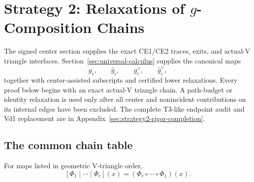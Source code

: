 \section{Strategy 2: Relaxations of \(g\)-Composition Chains}
\label{sec:strategy2-reader}

The signed center section supplies the exact CE1/CE2 traces, exits, and
actual-V triangle interfaces.  Section~\ref{sec:universal-calculus} supplies the
canonical maps
\[
 g_c,\qquad \widehat g_c,\qquad
 g_c^\vee,\qquad \widehat g_c^\vee,
\]
together with center-assisted subscripts and certified lower relaxations.
Every proof below begins with an exact actual-V triangle chain.  A path-budget or
identity relaxation is used only after all center and nonincident contributions
on its internal edges have been excluded.  The complete T3-like endpoint audit
and Vd1 replacement are in Appendix~\ref{sec:strategy2-rigor-completion}.

\subsection{The common chain table}

For maps listed in geometric V-triangle order,
\[
 [\Phi_1\mid\cdots\mid\Phi_r](x)
 =(\Phi_r\circ\cdots\circ\Phi_1)(x).
\]

